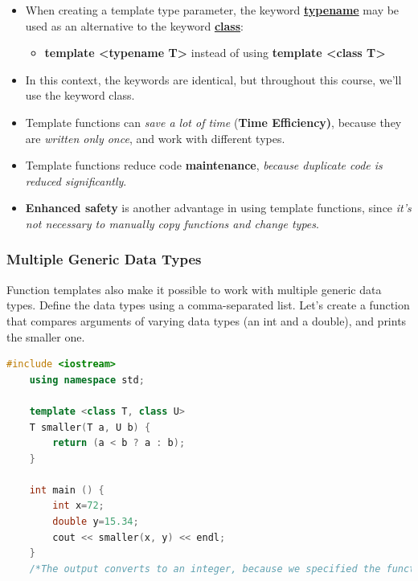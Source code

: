 \documentclass[12pt , a4paper]{article}
\newcommand{\hl}[1]{\colorbox{coolblack}{\color{cream}\textbf{#1}\color{black}}}
\begin{document}
	\begin{importantBox}
		\begin{itemize}
			\item When creating a template type parameter, the keyword \textbf{\underline{typename}} may be used as an alternative to the keyword \textbf{\underline{class}}:\\
			\begin{itemize}
				\item \hl{template <typename T>} instead of using \hl{template <class T>}\\
			\end{itemize} 
			\item In this context, the keywords are identical, but throughout this course, we'll use the keyword class.\\
			\item Template functions can \emph{save a lot of time} (\textbf{Time Efficiency)}, because they are \emph{written only once}, and work with different types.\\
			\item Template functions reduce code \textbf{maintenance}, \emph{because duplicate code is reduced significantly}.\\
			\item \textbf{Enhanced safety} is another advantage in using template functions, since \emph{it's not necessary to manually copy functions and change types}.\\
		\end{itemize}
	\end{importantBox}
	\subsubsection{Multiple Generic Data Types}
	Function templates also make it possible to work with multiple generic data types. Define the data types using a comma-separated list.
	Let's create a function that compares arguments of varying data types (an int and a double), and prints the smaller one.
	\begin{lstlisting}[language=C++]
	#include <iostream>
	using namespace std;
	
	template <class T, class U>
	T smaller(T a, U b) {
	    return (a < b ? a : b);
	}
	
	int main () {
	    int x=72;
	    double y=15.34;
	    cout << smaller(x, y) << endl;
	}
	/*The output converts to an integer, because we specified the function template's return type to be of the same type as the first parameter (T), which is an integer.*/
	\end{lstlisting}
\end{document}
